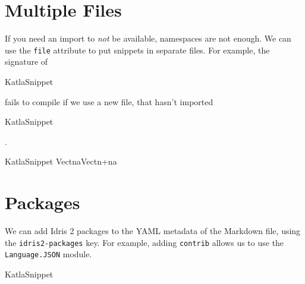 \hypertarget{multiple-files}{%
\section{Multiple Files}\label{multiple-files}}

If you need an import to \emph{not} be available, namespaces are not
enough. We can use the \texttt{file} attribute to put snippets in
separate files. For example, the signature of
\let\KatlaSnippet\relax{}\newcommand\KatlaSnippet[1][]{\UseVerb[#1]{KatlaSnippet}}
\begin{SaveVerbatim}[commandchars=\\\{\}]{KatlaSnippet}
\KatlaNewline{}
\end{SaveVerbatim}
\KatlaSnippet{} fails to compile if we use a new file, that hasn't
imported
\let\KatlaSnippet\relax{}\newcommand\KatlaSnippet[1][]{\UseVerb[#1]{KatlaSnippet}}
\begin{SaveVerbatim}[commandchars=\\\{\}]{KatlaSnippet}
\KatlaNewline{}
\end{SaveVerbatim}
\KatlaSnippet{}.

\let\KatlaSnippet\relax{}\newcommand\KatlaSnippet[1][]{\UseVerbatim[#1]{KatlaSnippet}}
\begin{SaveVerbatim}[commandchars=\\\{\}]{KatlaSnippet}
\KatlaSpace{}\KatlaNewline{}
\KatlaSpace{}\KatlaSpace{}\KatlaSpace{}\KatlaSpace{}\KatlaSpace{}\IdrisKeyword{:}\KatlaSpace{}Vect\KatlaSpace{}n\KatlaSpace{}a\KatlaSpace{}\IdrisKeyword{\KatlaDash{}>}\KatlaSpace{}Vect\KatlaSpace{}\IdrisKeyword{(}n\KatlaSpace{}+\KatlaSpace{}n\IdrisKeyword{)}\KatlaSpace{}a\KatlaNewline{}
\end{SaveVerbatim}
\KatlaSnippet{}

\hypertarget{packages}{%
\section{Packages}\label{packages}}

We can add Idris 2 packages to the YAML metadata of the Markdown file,
using the \texttt{idris2-packages} key. For example, adding
\texttt{contrib} allows us to use the \texttt{Language.JSON} module.

\let\KatlaSnippet\relax{}\newcommand\KatlaSnippet[1][]{\UseVerbatim[#1]{KatlaSnippet}}
\begin{SaveVerbatim}[commandchars=\\\{\}]{KatlaSnippet}
\KatlaSpace{}\KatlaNewline{}
\KatlaNewline{}
\KatlaSpace{}\IdrisKeyword{:}\KatlaSpace{}\KatlaSpace{}\KatlaNewline{}
\KatlaSpace{}\IdrisKeyword{=}\KatlaSpace{}\KatlaSpace{}\KatlaNewline{}
\end{SaveVerbatim}
\KatlaSnippet{}
